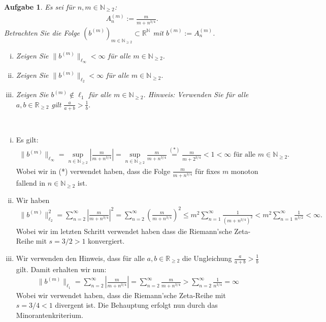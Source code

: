 \documentclass[a4paper, 20]{exam}
\newtheorem{ex}{Aufgabe}
\begin{document}
\begin{ex} Es sei für $n,m \in \mathbb{N}_{ \geq 2}$:
\begin{align*}
A_n^{(m)}:= \frac{m}{m+n^{3/4}}.
\end{align*}
Betrachten Sie die Folge $(b^{(m)})_{m \in \mathbb{N}_{ \geq 2}} \subset \mathbb{R}^\mathbb{N}$ mit $b^{(m)}:= A_n^{(m)}$. 
\begin{enumerate}[i)]
\item Zeigen Sie $\|b^{(m)}\|_{ \ell_\infty} < \infty$ für alle $m \in \mathbb{N}_{ \geq 2}$. 
\item Zeigen Sie $\| b^{(m)}\|_{ \ell_2} < \infty$ für alle $m \in \mathbb{N}_{ \geq 2}$. 
\item Zeigen Sie $b^{(m)} \notin \ell_1$ für alle $m \in \mathbb{N}_{ \geq 2}$. Hinweis: Verwenden Sie für alle $a,b \in \mathbb{R}_{ \geq 2}$ gilt  $\frac{a}{a+b} > \frac{1}{b}.$
\end{enumerate}
\end{ex}

\begin{solution} \
\begin{enumerate}[i)]
\item Es gilt:
\begin{align*}
\|b^{(m)}\|_{ \ell_\infty} = \sup_{n \in \mathbb{N}_{ \geq 2}} \left| \frac{m}{m+n^{3/4}}\right| = \sup_{n \in \mathbb{N}_{ \geq 2}} \frac{m}{m+n^{3/4}} \overset{(*)}= \frac{m}{m+2^{3/4}}<1< \infty \text{ für alle }m \in \mathbb{N}_{ \geq 2}.
\end{align*}
Wobei wir in (*) verwendet haben, dass die Folge $\frac{m}{m+n^{3/4}}$ für fixes $m$ monoton fallend in $n \in \mathbb{N}_{ \geq 2}$ ist. 
\item Wir haben 
\begin{align*}
\|b^{(m)}\|_{ \ell_2}^2 = \sum_{n=2}^\infty \left| \frac{m}{m+n^{3/4}}\right|^2 = \sum_{n=2}^\infty \left( \frac{m}{m+n^{3/4}}\right)^2 \leq m^2 \sum_{n=1}^\infty \frac{1}{(m+n^{3/4})^2}< m^2 \sum_{n=1}^\infty \frac{1}{n^{3/2}}< \infty.
\end{align*}
Wobei wir im letzten Schritt verwendet haben dass die Riemann'sche Zeta-Reihe mit $s=3/2 >1$ konvergiert. 
\item Wir verwenden den Hinweis, dass für alle $a,b \in \mathbb{R}_{ \geq 2}$ die Ungleichung $\frac{a}{a+b}> \frac{1}{b}$ gilt. Damit erhalten wir nun:
\begin{align*}
\|b^{(m)}\|_{ \ell_1} = \sum_{n=2}^\infty \left| \frac{m}{m+n^{3/4}}\right| = \sum_{n=2}^\infty \frac{m}{m+n^{3/4}}> \sum_{n=2}^\infty \frac{1}{n^{3/4}} = \infty
\end{align*}
Wobei wir verwendet haben, dass die Riemann'sche Zeta-Reihe mit $s=3/4 < 1$ divergent ist. Die Behauptung erfolgt nun durch das Minorantenkriterium. 
\end{enumerate}
\end{solution}
\end{document}
